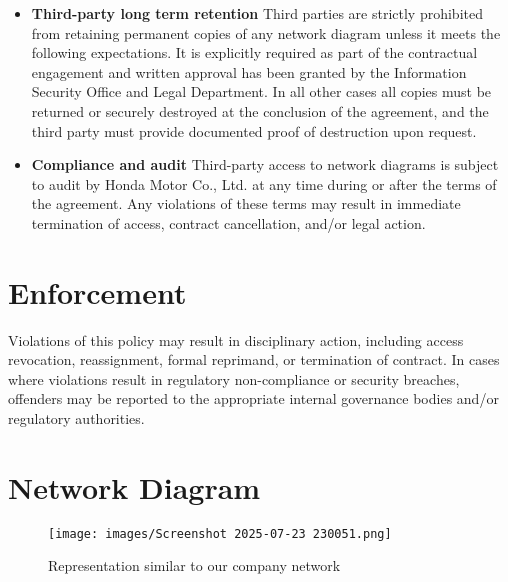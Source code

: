 \begin{itemize}
    \item \textbf{Third-party long term retention}
    Third parties are strictly prohibited from retaining permanent copies of any network diagram unless it meets the following expectations. It is explicitly required as part of the contractual engagement and written approval has been granted by the Information Security Office and Legal Department. In all other cases all copies must be returned or securely destroyed at the conclusion of the agreement, and the third party must provide documented proof of destruction upon request.
    \item \textbf{Compliance and audit}
    Third-party access to network diagrams is subject to audit by Honda Motor Co., Ltd. at any time during or after the terms of the agreement. Any violations of these terms may result in immediate termination of access, contract cancellation, and/or legal action.
\end{itemize}
\section{Enforcement}
Violations of this policy may result in disciplinary action, including access revocation, reassignment, formal reprimand, or termination of contract. In cases where violations result in regulatory non-compliance or security breaches, offenders may be reported to the appropriate internal governance bodies and/or regulatory authorities.

\section{Network Diagram}
\begin{figure}[htbp]
    \centering
    \texttt{[image: images/Screenshot 2025-07-23 230051.png]}
    \caption{Representation similar to our company network}
    \label{fig:Diagram 7.23.2025}
\end{figure}
